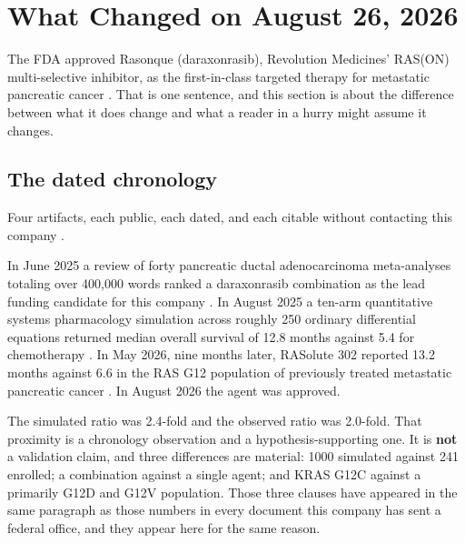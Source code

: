 \section{What Changed on August 26, 2026}

The FDA approved Rasonque (daraxonrasib), Revolution Medicines' RAS(ON)
multi-selective inhibitor, as the first-in-class targeted therapy for metastatic
pancreatic cancer \cite{fdarasonque2026}. That is one sentence, and this section
is about the difference between what it does change and what a reader in a hurry
might assume it changes.

\subsection{The dated chronology}

Four artifacts, each public, each dated, and each citable without contacting this
company \cite{daraxstory2026}.

In June 2025 a review of forty pancreatic ductal adenocarcinoma meta-analyses
totaling over 400,000 words ranked a daraxonrasib combination as the lead funding
candidate for this company \cite{daraxident}. In August 2025 a ten-arm
quantitative systems pharmacology simulation across roughly 250 ordinary
differential equations returned median overall survival of 12.8 months against
5.4 for chemotherapy \cite{qspmetpancre}. In May 2026, nine months later,
RASolute 302 reported 13.2 months against 6.6 in the RAS G12 population of
previously treated metastatic pancreatic cancer \cite{rasolute302}. In August
2026 the agent was approved.

The simulated ratio was 2.4-fold and the observed ratio was 2.0-fold. That
proximity is a chronology observation and a hypothesis-supporting one. It is
\textbf{not} a validation claim, and three differences are material: 1000
simulated against 241 enrolled; a combination against a single agent; and KRAS
G12C against a primarily G12D and G12V population. Those three clauses have
appeared in the same paragraph as those numbers in every document this company
has sent a federal office, and they appear here for the same reason.

